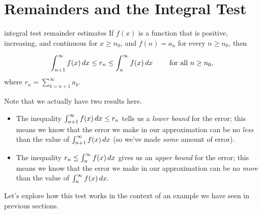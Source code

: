 \documentclass{ximera}
\begin{document}

\section{Remainders and the Integral Test}

\begin{theorem}{integral test remainder estimates}
If $f(x)$ is a function that is positive, increasing, and continuous for $x \geq n_0$,  and $f(n) = a_n$ for every $n \geq n_0$, then 

\[
\int_{n+1}^{\infty} f(x) \mathop{}\!d x \leq  r_n \leq \int_{n}^{\infty} f(x) \mathop{}\!d x \qquad \textrm{ for all } n \geq n_0,
\]
where $r_n = \sum_{k=n+1}^{\infty} a_k$.
\end{theorem}

Note that we actually have two results here.

\begin{itemize}
\item The inequality $\int_{n+1}^{\infty} f(x) \mathop{}\!d x \leq  r_n$ tells us a \emph{lower bound} for the error; this means we know that the error we make in our approximation can be no \emph{less} than the value of $\int_{n+1}^{\infty} f(x) \mathop{}\!d x$ (so we've made \emph{some} amount of error).

\item The inequality $r_n \leq \int_{n}^{\infty} f(x) \mathop{}\!d x$ gives us an \emph{upper bound} for the error; this means we know that the error we make in our approximation can be no \emph{more} than the value of $\int_{n}^{\infty} f(x) \mathop{}\!d x$.
\end{itemize}

Let's explore how this test works in the context of an example we have seen in previous sections.
\end{document}
